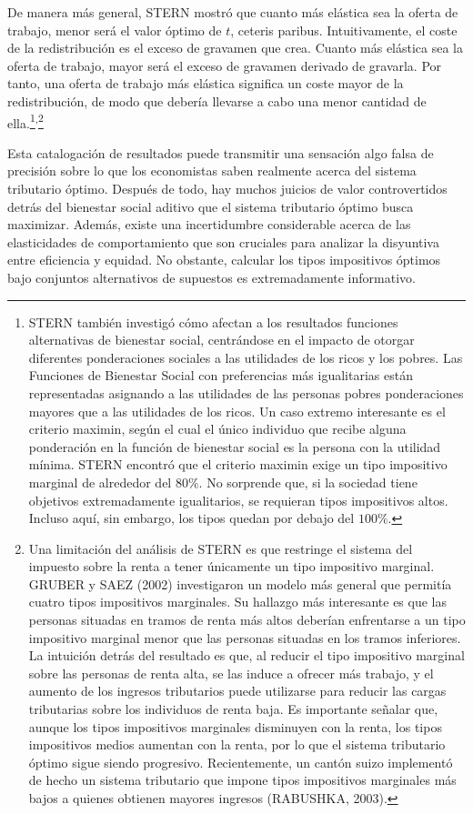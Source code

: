 \documentclass[10pt,a4paper]{article}
\begin{document}
De manera más general, STERN mostró que cuanto más elástica sea la oferta de trabajo, menor será el valor óptimo de $t$, ceteris paribus. Intuitivamente, el coste de la redistribución es el exceso de gravamen que crea. Cuanto más elástica sea la oferta de trabajo, mayor será el exceso de gravamen derivado de gravarla. Por tanto, una oferta de trabajo más elástica significa un coste mayor de la redistribución, de modo que debería llevarse a cabo una menor cantidad de ella.\footnote{%
    STERN también investigó cómo afectan a los resultados funciones alternativas de bienestar social, centrándose en el impacto de otorgar diferentes ponderaciones sociales a las utilidades de los ricos y los pobres. Las Funciones de Bienestar Social con preferencias más igualitarias están representadas asignando a las utilidades de las personas pobres ponderaciones mayores que a las utilidades de los ricos. Un caso extremo interesante es el criterio maximin, según el cual el único individuo que recibe alguna ponderación en la función de bienestar social es la persona con la utilidad mínima. STERN encontró que el criterio maximin exige un tipo impositivo marginal de alrededor del $80\%$. No sorprende que, si la sociedad tiene objetivos extremadamente igualitarios, se requieran tipos impositivos altos. Incluso aquí, sin embargo, los tipos quedan por debajo del $100\%$.
}\textsuperscript{,}\footnote{%
    Una limitación del análisis de STERN es que restringe el sistema del impuesto sobre la renta a tener únicamente un tipo impositivo marginal. GRUBER y SAEZ (2002) investigaron un modelo más general que permitía cuatro tipos impositivos marginales. Su hallazgo más interesante es que las personas situadas en tramos de renta más altos deberían enfrentarse a un tipo impositivo marginal menor que las personas situadas en los tramos inferiores. La intuición detrás del resultado es que, al reducir el tipo impositivo marginal sobre las personas de renta alta, se las induce a ofrecer más trabajo, y el aumento de los ingresos tributarios puede utilizarse para reducir las cargas tributarias sobre los individuos de renta baja. Es importante señalar que, aunque los tipos impositivos marginales disminuyen con la renta, los tipos impositivos medios aumentan con la renta, por lo que el sistema tributario óptimo sigue siendo progresivo. Recientemente, un cantón suizo implementó de hecho un sistema tributario que impone tipos impositivos marginales más bajos a quienes obtienen mayores ingresos (RABUSHKA, 2003).
}

Esta catalogación de resultados puede transmitir una sensación algo falsa de precisión sobre lo que los economistas saben realmente acerca del sistema tributario óptimo. Después de todo, hay muchos juicios de valor controvertidos detrás del bienestar social aditivo que el sistema tributario óptimo busca maximizar. Además, existe una incertidumbre considerable acerca de las elasticidades de comportamiento que son cruciales para analizar la disyuntiva entre eficiencia y equidad. No obstante, calcular los tipos impositivos óptimos bajo conjuntos alternativos de supuestos es extremadamente informativo. 
\end{document}
